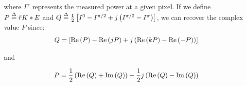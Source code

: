 \documentclass[10pt]{article}
\begin{document}
where $I^\alpha$ represents the measured power at a given pixel. If we define %
$P \buildrel \Delta \over = \bar rK*E$
and 
$Q \buildrel \Delta \over = \frac{1}{2}\left[ {{I^0} - {I^{\pi /2}} + j\left( {{I^{\pi /2}} - {I^\pi }} \right)} \right]$,
we can recover the complex value $P$ since:
\[Q = \left[ {{\rm{Re}}\left( P \right) - {\rm{Re}}\left( {jP} \right) + j\left( {{\rm{Re}}\left( {kP} \right) - {\rm{Re}}\left( { - P} \right)} \right)} \right]\]

and

\[P = \frac{1}{2}\left( {{\rm{Re}}\left( Q \right) + {\mathop{\rm Im}\nolimits} \left( Q \right)} \right) + \frac{1}{2}j\left( {{\rm{Re}}\left( Q \right) - {\mathop{\rm Im}\nolimits} \left( Q \right)} \right)\]
\end{document}
